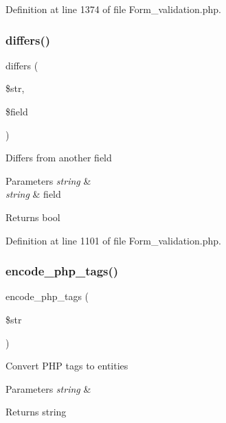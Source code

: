 Definition at line 1374 of file Form\+\_\+validation.\+php.

\mbox{\label{class_c_i___form__validation_aff14b601a3e51ef2323a4c241d81267e}} 
\subsubsection{\texorpdfstring{differs()}{differs()}}
{\footnotesize\ttfamily differs (\begin{DoxyParamCaption}\item[{}]{\$str,  }\item[{}]{\$field }\end{DoxyParamCaption})}

Differs from another field


\begin{DoxyParams}{Parameters}
{\em string} & \\
\hline
{\em string} & field \\
\hline
\end{DoxyParams}
\begin{DoxyReturn}{Returns}
bool 
\end{DoxyReturn}


Definition at line 1101 of file Form\+\_\+validation.\+php.

\mbox{\label{class_c_i___form__validation_ae8fff4cb083a2a66c900f8bd61216bdd}} 
\subsubsection{\texorpdfstring{encode\_php\_tags()}{encode\_php\_tags()}}
{\footnotesize\ttfamily encode\+\_\+php\+\_\+tags (\begin{DoxyParamCaption}\item[{}]{\$str }\end{DoxyParamCaption})}

Convert P\+HP tags to entities


\begin{DoxyParams}{Parameters}
{\em string} & \\
\hline
\end{DoxyParams}
\begin{DoxyReturn}{Returns}
string 
\end{DoxyReturn}


